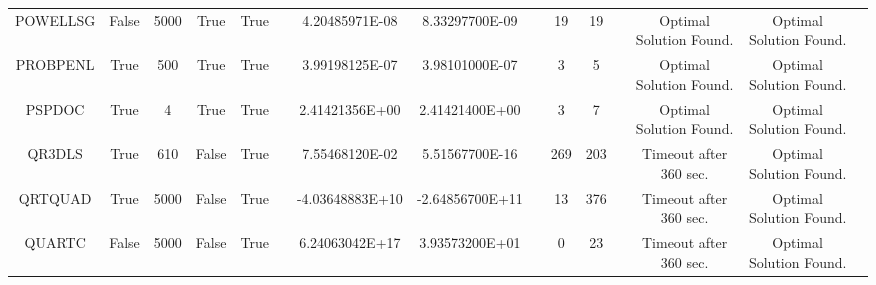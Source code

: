 \begin{longtable}{ccccccccccccccc}
	\cellcolor{default2} POWELLSG& \cellcolor{default2} False& \cellcolor{default2} 5000& \cellcolor{default2} True& \cellcolor{default2} True& \cellcolor{header} & \cellcolor{ok} 4.20485971E-08& \cellcolor{best} 8.33297700E-09& \cellcolor{header} & \cellcolor{best} 19& \cellcolor{best} 19& \cellcolor{header} & \cellcolor{default2} Optimal Solution Found.& \cellcolor{default2} Optimal Solution Found.& \cellcolor{header} \\
	\cellcolor{default1} PROBPENL& \cellcolor{default1} True& \cellcolor{default1} 500& \cellcolor{default1} True& \cellcolor{default1} True& \cellcolor{header} & \cellcolor{ok} 3.99198125E-07& \cellcolor{best} 3.98101000E-07& \cellcolor{header} & \cellcolor{best} 3& \cellcolor{ok} 5& \cellcolor{header} & \cellcolor{default1} Optimal Solution Found.& \cellcolor{default1} Optimal Solution Found.& \cellcolor{header} \\
	\cellcolor{default2} PSPDOC& \cellcolor{default2} True& \cellcolor{default2} 4& \cellcolor{default2} True& \cellcolor{default2} True& \cellcolor{header} & \cellcolor{best} 2.41421356E+00& \cellcolor{ok} 2.41421400E+00& \cellcolor{header} & \cellcolor{best} 3& \cellcolor{poor} 7& \cellcolor{header} & \cellcolor{default2} Optimal Solution Found.& \cellcolor{default2} Optimal Solution Found.& \cellcolor{header} \\
	\cellcolor{default1} QR3DLS& \cellcolor{default1} True& \cellcolor{default1} 610& \cellcolor{default1} False& \cellcolor{default1} True& \cellcolor{header} & \cellcolor{poor} 7.55468120E-02& \cellcolor{best} 5.51567700E-16& \cellcolor{header} & \cellcolor{ok} 269& \cellcolor{best} 203& \cellcolor{header} & \cellcolor{default1} Timeout after 360 sec.& \cellcolor{default1} Optimal Solution Found.& \cellcolor{header} \\
	\cellcolor{default2} QRTQUAD& \cellcolor{default2} True& \cellcolor{default2} 5000& \cellcolor{default2} False& \cellcolor{default2} True& \cellcolor{header} & \cellcolor{poor} -4.03648883E+10& \cellcolor{best} -2.64856700E+11& \cellcolor{header} & \cellcolor{best} 13& \cellcolor{poor} 376& \cellcolor{header} & \cellcolor{default2} Timeout after 360 sec.& \cellcolor{default2} Optimal Solution Found.& \cellcolor{header} \\
	\cellcolor{default1} QUARTC& \cellcolor{default1} False& \cellcolor{default1} 5000& \cellcolor{default1} False& \cellcolor{default1} True& \cellcolor{header} & \cellcolor{poor} 6.24063042E+17& \cellcolor{best} 3.93573200E+01& \cellcolor{header} & \cellcolor{best} 0& \cellcolor{poor} 23& \cellcolor{header} & \cellcolor{default1} Timeout after 360 sec.& \cellcolor{default1} Optimal Solution Found.& \cellcolor{header} \\

\end{longtable}
